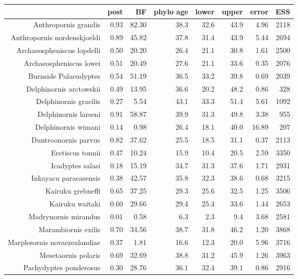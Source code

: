 \begin{table}[ht]
\centering
\scriptsize
\begin{tabular}{rrrrrrrr}
  \hline
 & post & BF & phylo age & lower & upper & error & ESS \\ 
  \hline
Anthropornis grandis & 0.93 & 82.30 & 38.3 & 32.6 & 43.9 & 4.96 & 2118 \\ 
  Anthropornis nordenskjoeldi & 0.89 & 45.82 & 37.8 & 31.4 & 43.9 & 5.44 & 2694 \\ 
  Archaeospheniscus lopdelli & 0.50 & 20.20 & 26.4 & 21.1 & 30.8 & 1.61 & 2500 \\ 
  Archaeospheniscus lowei & 0.51 & 20.49 & 27.6 & 21.1 & 33.6 & 0.35 & 2076 \\ 
  Burnside Palaeudyptes & 0.54 & 51.19 & 36.5 & 33.2 & 39.8 & 0.69 & 2039 \\ 
  Delphinornis arctowskii & 0.49 & 13.95 & 36.6 & 20.2 & 48.2 & 0.86 & 328 \\ 
  Delphinornis gracilis & 0.27 & 5.54 & 43.1 & 33.3 & 51.4 & 5.61 & 1092 \\ 
  Delphinornis larseni & 0.91 & 58.87 & 39.9 & 31.3 & 49.8 & 3.38 & 955 \\ 
  Delphinornis wimani & 0.14 & 0.98 & 26.4 & 18.1 & 40.0 & 16.89 & 207 \\ 
  Duntroonornis parvus & 0.82 & 37.62 & 25.5 & 18.5 & 31.1 & 0.37 & 2113 \\ 
  Eretiscus tonnii & 0.47 & 10.24 & 15.9 & 10.4 & 20.5 & 2.59 & 3350 \\ 
  Icadyptes salasi & 0.18 & 15.19 & 34.7 & 31.3 & 37.6 & 1.71 & 2931 \\ 
  Inkayacu paracasensis & 0.38 & 42.57 & 35.8 & 32.3 & 38.6 & 0.68 & 3215 \\ 
  Kairuku grebneffi & 0.65 & 37.25 & 29.3 & 25.6 & 32.5 & 1.25 & 3506 \\ 
  Kairuku waitaki & 0.60 & 29.66 & 29.4 & 25.4 & 33.6 & 1.44 & 2653 \\ 
  Madrynornis mirandus & 0.01 & 0.58 & 6.3 & 2.3 & 9.4 & 3.68 & 2581 \\ 
  Marambiornis exilis & 0.70 & 34.56 & 38.7 & 31.8 & 46.2 & 1.20 & 3868 \\ 
  Marplesornis novaezealandiae & 0.37 & 1.81 & 16.6 & 12.3 & 20.0 & 5.96 & 3716 \\ 
  Mesetaornis polaris & 0.69 & 32.69 & 38.8 & 31.2 & 45.9 & 1.26 & 3963 \\ 
  Pachydyptes ponderosus & 0.30 & 28.76 & 36.1 & 32.4 & 39.1 & 0.86 & 2916 \\ 

\end{tabular}
\end{table}
